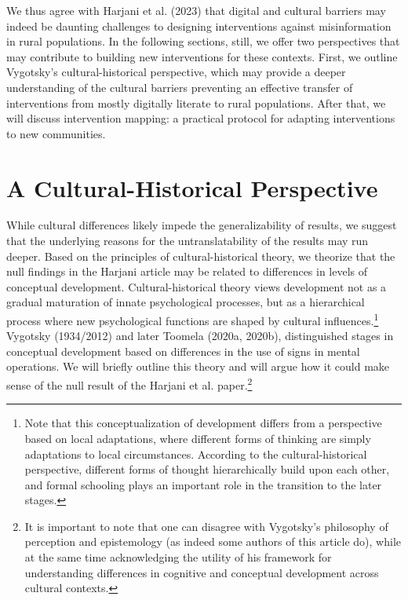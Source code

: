 \documentclass[authordate, reflection, issue]{jote-new-article}
\begin{document}
	We thus agree with Harjani et al. (2023) that digital and cultural barriers may indeed be daunting challenges to designing interventions against misinformation in rural populations. In the following sections, still, we offer two perspectives that may contribute to building new interventions for these contexts. First, we outline Vygotsky's cultural-historical perspective, which may provide a deeper understanding of the cultural barriers preventing an effective transfer of interventions from mostly digitally literate to rural populations. After that, we will discuss intervention mapping: a practical protocol for adapting interventions to new communities.



	\section{A Cultural-Historical Perspective}



	While cultural differences likely impede the generalizability of results, we suggest that the underlying reasons for the untranslatability of the results may run deeper. Based on the principles of cultural-historical theory, we theorize that the null findings in the Harjani article may be related to differences in levels of conceptual development. Cultural-historical theory views development not as a gradual maturation of innate psychological processes, but as a hierarchical process where new psychological functions are shaped by cultural influences.\footnote{Note that this conceptualization of development differs from a perspective based on local adaptations, where different forms of thinking are simply adaptations to local circumstances. According to the cultural-historical perspective, different forms of thought hierarchically build upon each other, and formal schooling plays an important role in the transition to the later stages.} Vygotsky (1934/2012) and later Toomela (2020a, 2020b), distinguished stages in conceptual development based on differences in the use of signs in mental operations. We will briefly outline this theory and will argue how it could make sense of the null result of the Harjani et al. paper.\footnote{It is important to note that one can disagree with Vygotsky's philosophy of perception and epistemology (as indeed some authors of this article do), while at the same time acknowledging the utility of his framework for understanding differences in cognitive and conceptual development across cultural contexts.}
\end{document}
